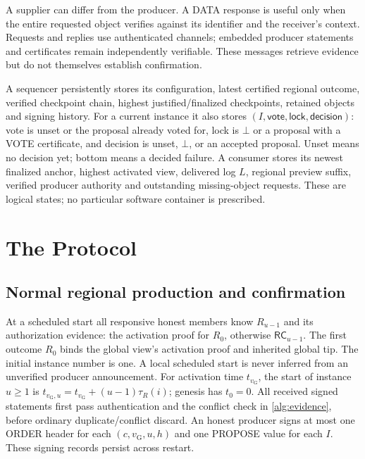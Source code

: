 \documentclass[11pt,a4paper,onecolumn]{article}
\newcommand{\RC}{\mathsf{RC}}
\newcommand{\gv}{v_{\mathrm G}}
\newcommand{\botv}{\bot}
\theoremstyle{remark}\newtheorem{example}[definition]{Example}
\newcounter{protocol}
\begin{document}
A supplier can differ from the producer. A DATA response is useful only when
the entire requested object verifies against its identifier and the receiver's
context. Requests and replies use authenticated channels; embedded producer
statements and certificates remain independently verifiable. These messages
retrieve evidence but do not themselves establish confirmation.

A sequencer persistently stores its configuration, latest certified regional
outcome, verified checkpoint chain, highest justified/finalized checkpoints,
retained objects and signing history. For a current instance it also stores
$(I,\mathsf{vote},\mathsf{lock},\mathsf{decision})$: vote is unset or the proposal
already voted for, lock is $\botv$ or a proposal with a VOTE certificate, and
decision is unset, $\botv$, or an accepted proposal. Unset means no decision
yet; bottom means a decided failure. A consumer stores its newest finalized
anchor, highest activated view, delivered log $L$, regional preview suffix,
verified producer authority and outstanding missing-object requests. These
are logical states; no particular software container is prescribed.

\section{The Protocol}\label{sec:protocol}
\subsection{Normal regional production and confirmation}\label{sec:regional}
At a scheduled start all responsive honest members know $R_{u-1}$ and its
authorization evidence: the activation proof for $R_0$, otherwise
$\RC_{u-1}$. The first outcome $R_0$ binds the global view's activation proof
and inherited global tip. The initial instance number is one. A local scheduled
start is never inferred from an unverified producer announcement.
For activation time $t_{\gv}$, the start of instance $u\geq1$ is
$t_{\gv,u}=t_{\gv}+(u-1)\tau_R(i)$; genesis has $t_0=0$.
All received signed statements first pass authentication and the conflict
check in \cref{alg:evidence}, before ordinary duplicate/conflict discard.
An honest producer signs at most one ORDER header for each $(c,\gv,u,h)$ and
one PROPOSE value for each $I$. These signing records persist across restart.
\end{document}
